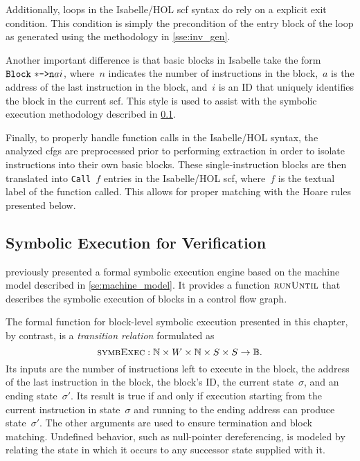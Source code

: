 Additionally, loops in the Isabelle/HOL \ac{scf} syntax
do rely on a explicit exit condition.
This condition is simply the precondition of the entry block of the loop
as generated using the methodology in \cref{sse:inv_gen}.

Another important difference is that basic blocks in Isabelle
take the form $\texttt{Block}~\mathtt{*\texttt{->}n}{a}{i}$,
where~$n$ indicates the number of instructions in the block,~$a$ is the address
of the last instruction in the block, and~$i$ is an ID
that uniquely identifies the block in the current \ac{scf}.
This style is used to assist with the symbolic execution methodology described in
\cref{sse:syntax_ver_symb}.

Finally, to properly handle function calls in the Isabelle/HOL syntax,
the analyzed \acp{cfg} are preprocessed prior to performing extraction
in order to isolate  instructions into their own basic blocks.
These single-instruction blocks are then translated into \texttt{Call}~$f$ entries
in the Isabelle/HOL \ac{scf}, where~$f$ is the textual label of the function called.
This allows for proper matching with the Hoare rules presented below.

\subsection{Symbolic Execution for Verification}\label{sse:syntax_ver_symb}
 previously presented a formal symbolic execution engine
based on the machine model described in \cref{se:machine_model}.
It provides a function $\operatorname{\textsc{runUntil}}$ that describes the symbolic execution of
blocks in a control flow graph.

The formal function for block-level symbolic execution presented in this chapter,%
by contrast, is a \emph{transition relation}%
 formulated as
\begin{equation*}
  \operatorname{\textsc{symbExec}}:\mathbb N\times W\times\mathbb N\times S\times S\rightarrow\mathbb{B}.
\end{equation*}
Its inputs are the number of instructions left to execute in the block,
the address of the last instruction in the block, the block's ID,
the current state~$\sigma$, and an ending state~$\sigma'$.
Its result is true if and only if execution
starting from the current instruction in state~$\sigma$
and running to the ending address can produce state~$\sigma'$.
The other arguments are used to ensure termination and block matching.
Undefined behavior, such as null-pointer dereferencing,
is modeled by relating the state in which it occurs to any successor state
supplied with it.

